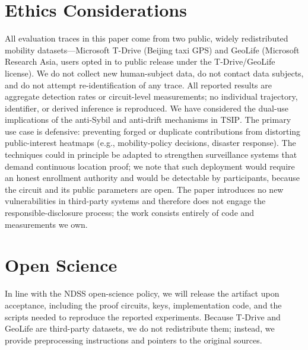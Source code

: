 \documentclass[conference]{IEEEtran}
\theoremstyle{definition}
\theoremstyle{plain}
\begin{document}
\section*{Ethics Considerations}
\label{sec:ethics}
All evaluation traces in this paper come from two public, widely
redistributed mobility datasets---Microsoft T-Drive (Beijing taxi GPS) and
GeoLife (Microsoft Research Asia, users opted in to public release under
the T-Drive/GeoLife license). We do not collect new human-subject data,
do not contact data subjects, and do not attempt re-identification of any
trace. All reported results are aggregate detection rates or circuit-level
measurements; no individual trajectory, identifier, or derived inference is
reproduced.
We have considered the dual-use implications of the anti-Sybil and
anti-drift mechanisms in \textsc{TSIP}. The primary use case is defensive:
preventing forged or duplicate contributions from distorting public-interest
heatmaps (e.g., mobility-policy decisions, disaster response).
The techniques could in principle be adapted to strengthen surveillance
systems that demand continuous location proof; we note that such deployment
would require an honest enrollment authority and would be detectable by
participants, because the circuit and its public parameters are open.
The paper introduces no new vulnerabilities in third-party systems and
therefore does not engage the responsible-disclosure process; the work
consists entirely of code and measurements we own.

\section*{Open Science}
\label{sec:open-science}
In line with the NDSS open-science policy, we will release the artifact
upon acceptance, including the proof circuits, keys, implementation code,
and the scripts needed to reproduce the reported experiments. Because
T-Drive and GeoLife are third-party datasets, we do not redistribute them;
instead, we provide preprocessing instructions and pointers to the
original sources.

\printbibliography
\end{document}
